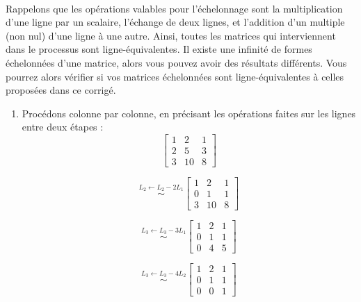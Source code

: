 


\begin{exercice}
\,

\noindent Rappelons que les opérations valables pour l'échelonnage sont la multiplication d'une ligne par un scalaire, l'échange de deux lignes, et l'addition d'un multiple (non nul) d'une ligne à une autre.  Ainsi, toutes les matrices qui interviennent dans le processus sont ligne-équivalentes. Il existe une infinité de formes échelonnées d'une matrice, alors vous pouvez avoir des résultats différents. Vous pourrez alors vérifier si vos matrices échelonnées sont ligne-équivalentes à celles proposées dans ce corrigé. 
\begin{enumerate}

\item Procédons colonne par colonne, en précisant les opérations faites sur les lignes entre deux étapes :
$$  \begin{bmatrix}
    1 & 2 & 1 \\
    2 & 5 & 3\\
    3 & 10 & 8
    \end{bmatrix}
$$

$$ 
\overset{L_2 \leftarrow L_2 - 2L_1}{\sim}
\begin{bmatrix}
    1 & 2 & 1 \\
    0 & 1 & 1\\
    3 & 10 & 8
    \end{bmatrix}
$$

$$ 
\overset{L_3 \leftarrow L_3 - 3L_1}{\sim}
\begin{bmatrix}
    1 & 2 & 1 \\
    0 & 1 & 1\\
    0 & 4 & 5
    \end{bmatrix}
$$

$$
\overset{L_3 \leftarrow L_3 - 4L_2}{\sim}
\begin{bmatrix}
    1 & 2 & 1 \\
    0 & 1 & 1\\
    0 & 0 &  1
    \end{bmatrix}
$$


\end{enumerate}
\end{exercice}
